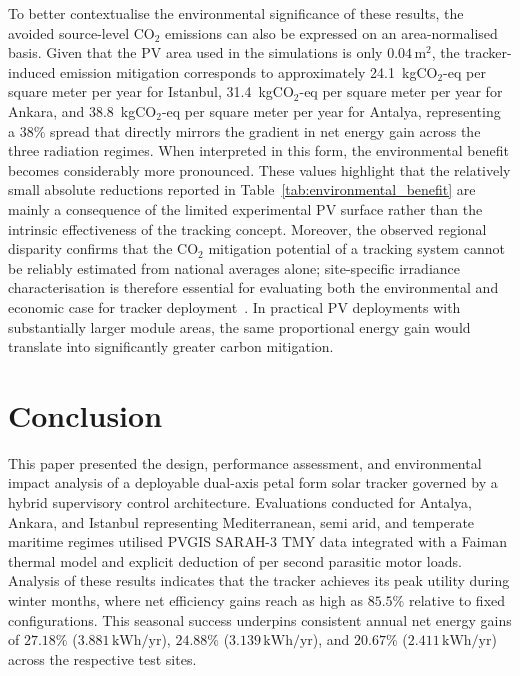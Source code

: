 \documentclass[preprint,3p,12pt]{elsarticle}
\begin{document}
To better contextualise the environmental significance of these
results, the avoided source-level CO$_2$ emissions can also be
expressed on an area-normalised basis. Given that the PV area used
in the simulations is only $0.04\,\mathrm{m}^2$, the
tracker-induced emission mitigation corresponds to approximately
24.1~kgCO$_2$-eq per square meter per year for Istanbul,
31.4~kgCO$_2$-eq per square meter per year for Ankara, and
38.8~kgCO$_2$-eq per square meter per year for Antalya, representing
a $38\%$ spread that directly mirrors the gradient in net energy
gain across the three radiation regimes. When interpreted in this
form, the environmental benefit becomes considerably more
pronounced. These values highlight that the relatively small absolute
reductions reported in Table~\ref{tab:environmental_benefit} are
mainly a consequence of the limited experimental PV surface rather
than the intrinsic effectiveness of the tracking concept. Moreover,
the observed regional disparity confirms that the CO$_2$ mitigation
potential of a tracking system cannot be reliably estimated from
national averages alone; site-specific irradiance characterisation
is therefore essential for evaluating both the environmental and
economic case for tracker deployment~\cite{Parlak2024}. In
practical PV deployments with substantially larger module areas,
the same proportional energy gain would translate into
significantly greater carbon mitigation.

\section{Conclusion}
\label{sec:conclusion}

This paper presented the design, performance assessment, and
environmental impact analysis of a deployable dual-axis petal form
solar tracker governed by a hybrid supervisory control architecture.
Evaluations conducted for Antalya, Ankara, and Istanbul representing
Mediterranean, semi arid, and temperate maritime regimes utilised
PVGIS SARAH-3 TMY data integrated with a Faiman thermal model and
explicit deduction of per second parasitic motor loads. Analysis of
these results indicates that the tracker achieves its peak utility
during winter months, where net efficiency gains reach as high as
$85.5\%$ relative to fixed configurations. This seasonal success
underpins consistent annual net energy gains of $27.18\%$
($3.881\,\mathrm{kWh/yr}$), $24.88\%$ ($3.139\,\mathrm{kWh/yr}$),
and $20.67\%$ ($2.411\,\mathrm{kWh/yr}$) across the respective test
sites.
\end{document}
